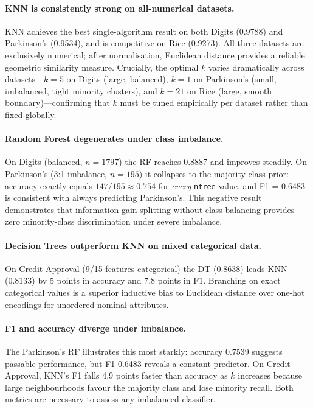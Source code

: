 \documentclass[11pt,letterpaper]{article}
\begin{document}
\paragraph{KNN is consistently strong on all-numerical datasets.}
KNN achieves the best single-algorithm result on both Digits (0.9788) and
Parkinson's (0.9534), and is competitive on Rice (0.9273).  All three
datasets are exclusively numerical; after normalisation, Euclidean distance
provides a reliable geometric similarity measure.  Crucially, the optimal
$k$ varies dramatically across datasets---$k=5$ on Digits (large, balanced),
$k=1$ on Parkinson's (small, imbalanced, tight minority clusters), and
$k=21$ on Rice (large, smooth boundary)---confirming that $k$ must be tuned
empirically per dataset rather than fixed globally.

\paragraph{Random Forest degenerates under class imbalance.}
On Digits (balanced, $n=1797$) the RF reaches 0.8887 and improves steadily.
On Parkinson's (3:1 imbalance, $n=195$) it collapses to the majority-class
prior: accuracy exactly equals $147/195\approx0.754$ for \emph{every}
\texttt{ntree} value, and F1 = 0.6483 is consistent with always predicting
Parkinson's.  This negative result demonstrates that information-gain
splitting without class balancing provides zero minority-class discrimination
under severe imbalance.

\paragraph{Decision Trees outperform KNN on mixed categorical data.}
On Credit Approval (9/15 features categorical) the DT (0.8638) leads KNN
(0.8133) by 5 points in accuracy and 7.8 points in F1.  Branching on exact
categorical values is a superior inductive bias to Euclidean distance over
one-hot encodings for unordered nominal attributes.

\paragraph{F1 and accuracy diverge under imbalance.}
The Parkinson's RF illustrates this most starkly: accuracy 0.7539 suggests
passable performance, but F1 0.6483 reveals a constant predictor.  On Credit
Approval, KNN's F1 falls 4.9 points faster than accuracy as $k$ increases
because large neighbourhoods favour the majority class and lose minority
recall.  Both metrics are necessary to assess any imbalanced classifier.
\end{document}
